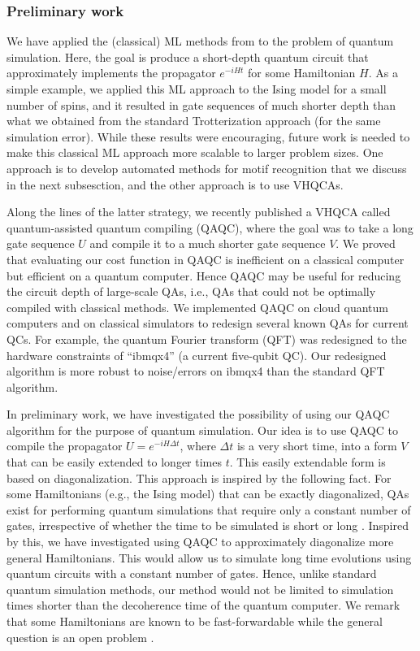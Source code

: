 \documentclass[10pt]{article}
\begin{document}
\subsubsection{Preliminary work} We have applied the (classical) ML methods from \cite{Cincio2018} to the problem of quantum simulation. Here, the goal is produce a short-depth quantum circuit that approximately implements the propagator $e^{-iHt}$ for some Hamiltonian $H$. As a simple example, we applied this ML approach to the Ising model for a small number of spins, and it resulted in gate sequences of much shorter depth than what we obtained from the standard Trotterization approach (for the same simulation error). While these results were encouraging, future work is needed to make this classical ML approach more scalable to larger problem sizes. One approach is to develop automated methods for motif recognition that we discuss in the next subsesction, and the other approach is to use VHQCAs.


Along the lines of the latter strategy, we recently published \cite{Khatri2018} a VHQCA called quantum-assisted quantum compiling (QAQC), where the goal was to take a long gate sequence $U$ and compile it to a much shorter gate sequence $V$. We proved that evaluating our cost function in QAQC is inefficient on a classical computer but efficient on a quantum computer. Hence QAQC may be useful for reducing the circuit depth of large-scale QAs, i.e., QAs that could not be optimally compiled with classical methods. We implemented QAQC on cloud quantum computers and on classical simulators to redesign several known QAs for current QCs. For example, the quantum Fourier transform (QFT) was redesigned to the hardware constraints of ``ibmqx4'' (a current five-qubit QC). Our redesigned algorithm is more robust to noise/errors on ibmqx4 than the standard QFT algorithm.

In preliminary work, we have investigated the possibility of using our QAQC algorithm for the purpose of quantum simulation. Our idea is to use QAQC to compile the propagator $U = e^{-iH \Delta t}$, where $\Delta t$ is a very short time, into a form $V$ that can be easily extended to longer times $t$. This easily extendable form is based on diagonalization. This approach is inspired by the following fact. For some Hamiltonians (e.g., the Ising model) that can be exactly diagonalized, QAs exist for performing quantum simulations that require only a constant number of gates, irrespective of whether the time to be simulated is short or long \cite{6}. Inspired by this, we have investigated using QAQC to approximately diagonalize more general Hamiltonians. This would allow us to simulate long time evolutions using quantum circuits with a constant number of gates. Hence, unlike standard quantum simulation methods, our method would not be limited to simulation times shorter than the decoherence time of the quantum computer. We remark that some Hamiltonians are known to be fast-forwardable while the general question is an open problem \cite{14}. 
\end{document}
